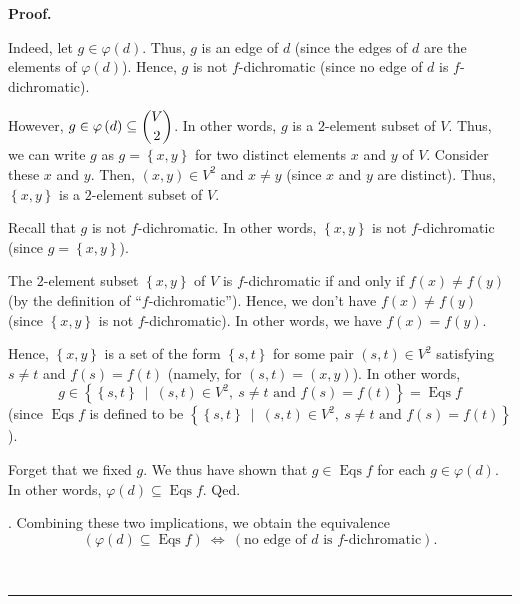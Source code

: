 \documentclass[numbers=enddot,12pt,final,onecolumn,notitlepage]{scrartcl}%
\theoremstyle{definition}
\newenvironment{proof}[1][Proof]{\noindent\textbf{#1.} }{\ \rule{0.5em}{0.5em}}
\newenvironment{verlong}{}{}
\begin{document}
\begin{verlong}
\begin{proof}
{\par
Indeed, let $g\in\varphi\left(  d\right)  $. Thus, $g$ is an edge of $d$
(since the edges of $d$ are the elements of $\varphi\left(  d\right)  $).
Hence, $g$ is not $f$-dichromatic (since no edge of $d$ is $f$-dichromatic).
\par
However, $g\in\varphi\left(  d\right)  \subseteq\dbinom{V}{2}$. In other
words, $g$ is a $2$-element subset of $V$. Thus, we can write $g$ as
$g=\left\{  x,y\right\}  $ for two distinct elements $x$ and $y$ of $V$.
Consider these $x$ and $y$. Then, $\left(  x,y\right)  \in V^{2}$ and $x\neq
y$ (since $x$ and $y$ are distinct). Thus, $\left\{  x,y\right\}  $ is a
$2$-element subset of $V$.
\par
Recall that $g$ is not $f$-dichromatic. In other words, $\left\{  x,y\right\}
$ is not $f$-dichromatic (since $g=\left\{  x,y\right\}  $).
\par
The $2$-element subset $\left\{  x,y\right\}  $ of $V$ is $f$-dichromatic if
and only if $f\left(  x\right)  \neq f\left(  y\right)  $ (by the definition
of \textquotedblleft$f$-dichromatic\textquotedblright). Hence, we don't have
$f\left(  x\right)  \neq f\left(  y\right)  $ (since $\left\{  x,y\right\}  $
is not $f$-dichromatic). In other words, we have $f\left(  x\right)  =f\left(
y\right)  $.
\par
Hence, $\left\{  x,y\right\}  $ is a set of the form $\left\{  s,t\right\}  $
for some pair $\left(  s,t\right)  \in V^{2}$ satisfying $s\neq t$ and
$f\left(  s\right)  =f\left(  t\right)  $ (namely, for $\left(  s,t\right)
=\left(  x,y\right)  $). In other words,%
\[
g\in\left\{  \left\{  s,t\right\}  \ \mid\ \left(  s,t\right)  \in
V^{2},\ s\neq t\text{ and }f\left(  s\right)  =f\left(  t\right)  \right\}
=\operatorname*{Eqs}f
\]
(since $\operatorname*{Eqs}f$ is defined to be $\left\{  \left\{  s,t\right\}
\ \mid\ \left(  s,t\right)  \in V^{2},\ s\neq t\text{ and }f\left(  s\right)
=f\left(  t\right)  \right\}  $).
\par
Forget that we fixed $g$. We thus have shown that $g\in\operatorname*{Eqs}f$
for each $g\in\varphi\left(  d\right)  $. In other words, $\varphi\left(
d\right)  \subseteq\operatorname*{Eqs}f$. Qed.}. Combining these two
implications, we obtain the equivalence%
\[
\left(  \varphi\left(  d\right)  \subseteq\operatorname*{Eqs}f\right)
\ \Longleftrightarrow\ \left(  \text{no edge of }d\text{ is }%
f\text{-dichromatic}\right)  .
\]



\end{proof}
\end{verlong}
\end{document}
